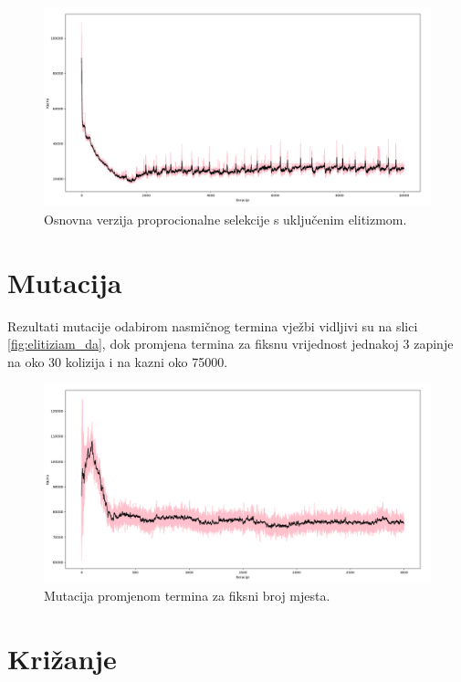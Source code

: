 \documentclass[times, utf8, zavrsni]{fer}
\begin{document}
\begin{figure}[htb]
\centering
\includegraphics[width=14cm]{images/proporcije_e_da_gore.png}
\caption{Osnovna verzija proprocionalne selekcije s uključenim elitizmom.}
\label{fig:proporcije_e_da_gore}
\end{figure}

\section{Mutacija}

Rezultati mutacije odabirom nasmičnog termina vježbi vidljivi su na slici \ref{fig:elitiziam_da}, dok promjena termina za fiksnu vrijednost jednakoj 3 zapinje na oko 30 kolizija i na kazni oko 75000.

\begin{figure}[htb]
\centering
\includegraphics[width=15cm]{images/plus_tri.png}
\caption{Mutacija promjenom termina za fiksni broj mjesta.}
\label{fig:plus_tri}
\end{figure}

\section{Križanje}
\end{document}
